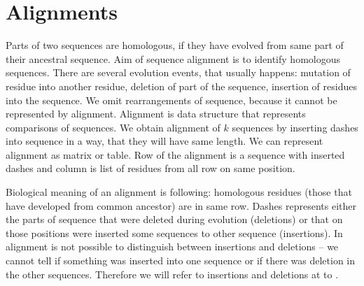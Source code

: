\chapter{Alignments}

Parts of two sequences are homologous, if they have evolved from same part of
their ancestral sequence. Aim of sequence alignment is to identify homologous
sequences. There are several evolution events, that usually happens:
mutation of residue into another residue, deletion of part of the sequence,
insertion of residues into the sequence. We omit rearrangements of sequence,
because it cannot be represented by alignment. Alignment is data structure that
represents comparisons of sequences. We obtain alignment of $k$ sequences by
inserting dashes into sequence in a way, that they will have same length. We can
represent alignment as matrix or table. Row of the alignment is a sequence with
inserted dashes and column is list of residues from all row on same position.


Biological meaning of an alignment is following: homologous residues (those that
have developed from common ancestor) are in same row. Dashes represents either
the parts of sequence that were deleted during evolution (deletions) or that on
those positions were inserted some sequences to other sequence (insertions). In
alignment is not possible to distinguish between insertions and deletions -- we
cannot tell if something was inserted into one sequence or if there was deletion 
in the other sequences. Therefore we will refer to insertions and deletions at
to .

